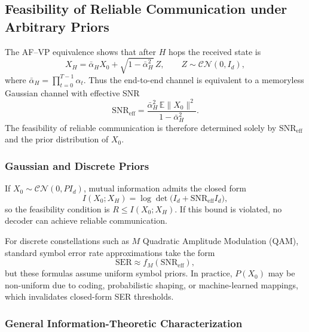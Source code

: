 \documentclass[journal]{IEEEtran}
\begin{document}
\subsection{Feasibility of Reliable Communication under Arbitrary Priors}
\label{sec:feasibility}

The AF--VP equivalence shows that after $H$ hops the received state is
\begin{equation}
    X_H = \bar\alpha_H X_0 + \sqrt{1-\bar\alpha_H^2}\,Z,
    \qquad Z\sim \mathcal{CN}(0,I_d),
    \label{eq:collapsed_siso}
\end{equation}
where $\bar\alpha_H=\prod_{t=0}^{T-1}\alpha_t$. 
Thus the end-to-end channel is equivalent to a memoryless Gaussian channel with effective SNR
\begin{equation}
    \mathrm{SNR}_{\mathrm{eff}}
    = \frac{\bar\alpha_H^2 \, \mathbb{E}\|X_0\|^2}{1-\bar\alpha_H^2}.
    \label{eq:eff_snr}
\end{equation}
The feasibility of reliable communication is therefore determined solely by $\mathrm{SNR}_{\mathrm{eff}}$ and the prior distribution of $X_0$.

\subsubsection{Gaussian and Discrete Priors}

If $X_0 \sim \mathcal{CN}(0,P I_d)$, mutual information admits the closed form
\begin{equation}
    I(X_0;X_H) = \log \det \!\big(I_d + \mathrm{SNR}_{\mathrm{eff}} I_d\big),
    \label{eq:gaussian_capacity}
\end{equation}
so the feasibility condition is $R \le I(X_0;X_H)$.  
If this bound is violated, no decoder can achieve reliable communication.  

For discrete constellations such as $M$ Quadratic Amplitude Modulation (QAM), standard symbol error rate approximations take the form
\begin{equation}
    \mathrm{SER} \approx f_M(\mathrm{SNR}_{\mathrm{eff}}),
\end{equation}
but these formulas assume uniform symbol priors. In practice, $P(X_0)$ may be non-uniform due to coding, probabilistic shaping, or machine-learned mappings, which invalidates closed-form SER thresholds.

\subsubsection{General Information-Theoretic Characterization}
\end{document}
